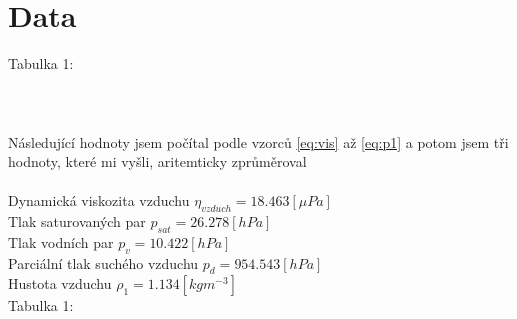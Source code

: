 \documentclass{article}
\begin{document}
\section{Data}
\footnotesize{Tabulka 1:}\\
\\
\normalsize{
}
\\
\vspace{1em}
\\
Následující hodnoty jsem počítal podle vzorců \ref{eq:vis} až \ref{eq:p1} a potom jsem
tři hodnoty, které mi vyšli, aritemticky zprůměroval\\\\
Dynamická viskozita vzduchu $\eta_{vzduch} = 18.463 [\mu Pa]$ \\
Tlak saturovaných par $p_{sat} = 26.278 [hPa]$ \\
Tlak vodních par $p_{v} = 10.422 [hPa]$ \\
Parciální tlak suchého vzduchu $p_{d} = 954.543 [hPa]$ \\
Hustota vzduchu $\rho_{1} = 1.134 [kg m^{-3}]$ \\

\footnotesize{Tabulka 1:}\\
\\
\normalsize{
}
\\
\vspace{1em}
\\
\end{document}
